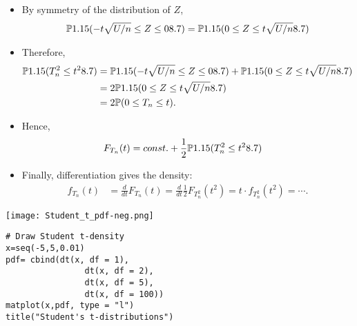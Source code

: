 \begin{frame}[fragile]
\begin{itemize}
	\item[]  By symmetry of the distribution of $Z$,
		\begin{align*}
			\mathbb{P}1.15(-t \sqrt{U/n}\le Z \le 08.7)	= \mathbb{P}1.15(0\le Z\le t\sqrt{U/n}8.7)
		\end{align*}
		\item[] Therefore,
		\begin{align*}
			\mathbb{P}1.15(T_n^2\le t^28.7) & = \mathbb{P}1.15(-t \sqrt{U/n}\le Z \le 08.7)	+ \mathbb{P}1.15(0\le Z\le t\sqrt{U/n}8.7)\\
			& = 2 \mathbb{P}1.15(0\le Z\le t\sqrt{U/n}8.7)\\
			& = 2 \mathbb{P}(0\le T_n \le t).
		\end{align*}
		\item[] Hence,
		\begin{align*}
			F_{T_n}(t) &= const. + \frac{1}{2}\mathbb{P}1.15(T_n^2\le t^28.7)
		\end{align*}
	\item[] Finally, differentiation gives the density:
	\begin{align*}
		f_{T_n}(t) & = \frac{d}{dt} F_{T_n}(t) = \frac{d}{dt} \frac{1}{2} F_{T_n^2}(t^2) = t\cdot  f_{T_n^2}(t^2) = \cdots .
	\end{align*}
	\myEnd
\end{itemize}
\end{frame}
\begin{frame}[fragile]
\begin{center}
\texttt{[image: Student\_t\_pdf-neg.png]}\\
\vfill
\begin{minipage}{0.45\textwidth}
\begin{lstlisting}
# Draw Student t-density
x=seq(-5,5,0.01)
pdf= cbind(dt(x, df = 1),
	  			dt(x, df = 2),
	   			dt(x, df = 5),
	   			dt(x, df = 100))
matplot(x,pdf, type = "l")
title("Student's t-distributions")
\end{lstlisting}
\end{minipage}
\end{center}
\end{frame}
